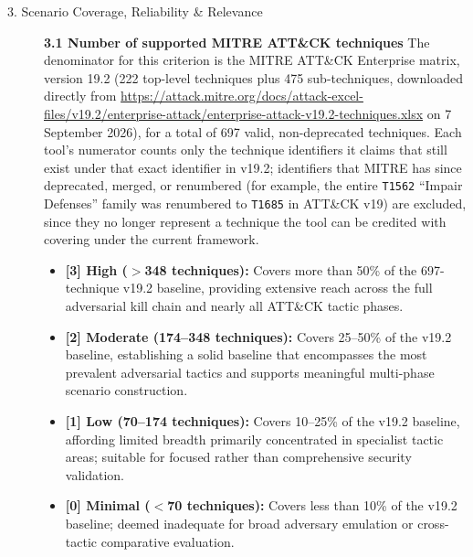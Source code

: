 \begin{description}
\item[3. Scenario Coverage, Reliability \& Relevance] \hfill \par
    \textbf{3.1 Number of supported MITRE ATT\&CK techniques}
    The denominator for this criterion is the MITRE ATT\&CK Enterprise
    matrix, version 19.2 (222 top-level techniques plus 475 sub-techniques,
    downloaded directly from
    \url{https://attack.mitre.org/docs/attack-excel-files/v19.2/enterprise-attack/enterprise-attack-v19.2-techniques.xlsx}
    on 7 September 2026), for a total of 697 valid, non-deprecated
    techniques. Each tool's numerator counts only the technique identifiers
    it claims that still exist under that exact identifier in v19.2;
    identifiers that MITRE has since deprecated, merged, or renumbered
    (for example, the entire \texttt{T1562} ``Impair Defenses'' family was
    renumbered to \texttt{T1685} in ATT\&CK v19) are excluded, since they no
    longer represent a technique the tool can be credited with covering
    under the current framework.
    \begin{itemize}
        \item \textbf{[3] High ($>$348 techniques):} Covers more than 50\% of
              the 697-technique v19.2 baseline, providing extensive reach
              across the full adversarial kill chain and nearly all ATT\&CK
              tactic phases.
        \item \textbf{[2] Moderate (174--348 techniques):} Covers 25--50\% of
              the v19.2 baseline, establishing a solid baseline that
              encompasses the most prevalent adversarial tactics and supports
              meaningful multi-phase scenario construction.
        \item \textbf{[1] Low (70--174 techniques):} Covers 10--25\% of the
              v19.2 baseline, affording limited breadth primarily
              concentrated in specialist tactic areas; suitable for focused
              rather than comprehensive security validation.
        \item \textbf{[0] Minimal ($<$70 techniques):} Covers less than
              10\% of the v19.2 baseline; deemed inadequate for
              broad adversary emulation or cross-tactic comparative evaluation.
    \end{itemize}


\end{description}
